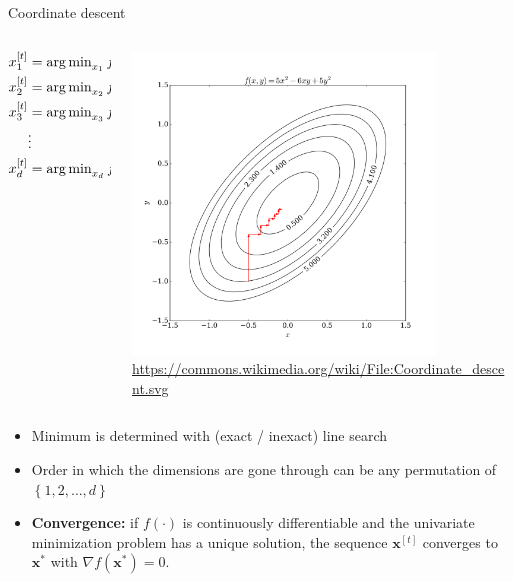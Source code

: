 \documentclass[11pt,compress,t,notes=noshow, xcolor=table]{beamer}
\begin{document}
\begin{vbframe}{Coordinate descent}
\begin{columns}
\begin{column}{.4\textwidth}
\begin{scriptsize}
\begin{align*}
x^{[t]}_1 &= \operatorname{arg\,min}_{x_1} f(x_1, x^{[t-1]}_2, x^{[t-1]}_3, \hdots, x^{[t-1]}_d) \\
x^{[t]}_2 &= \operatorname{arg\,min}_{x_2} f(x^{[t]}_1, x_2, x^{[t-1]}_3, \hdots, x^{[t-1]}_d) \\
x^{[t]}_3 &= \operatorname{arg\,min}_{x_3} f(x^{[t]}_1, x^{[t]}_2, x_3, \hdots, x^{[t-1]}_d) \\
&\vdots \\
x^{[t]}_d &= \operatorname{arg\,min}_{x_d} f(x^{[t]}_1, x^{[t]}_2, x^{[t]}_3, \hdots, x_d) \\
\end{align*}
\end{scriptsize}
\end{column}
\begin{column}{.5\textwidth}
\begin{center}
\vspace*{-0.3cm}
\includegraphics[width=0.8\textwidth]{figure_man/Coordinate_descent.png} \\
\tiny{\url{https://commons.wikimedia.org/wiki/File:Coordinate_descent.svg}}
\end{center}\end{column}
\end{columns}

\framebreak

\begin{itemize}
\item Minimum is determined with (exact / inexact) line search
\item Order in which the dimensions are gone through can be any permutation of $\left\{1,2,\hdots,d\right\}$
\item \textbf{Convergence:} if $f(\cdot)$ is continuously differentiable and the univariate minimization problem has a unique
solution, the sequence $\bm{x}^{[t]}$ converges to $\bm{x}^{*}$ with $\nabla f(\bm{x}^*) = 0$.


\end{itemize}
\end{vbframe}
\end{document}
